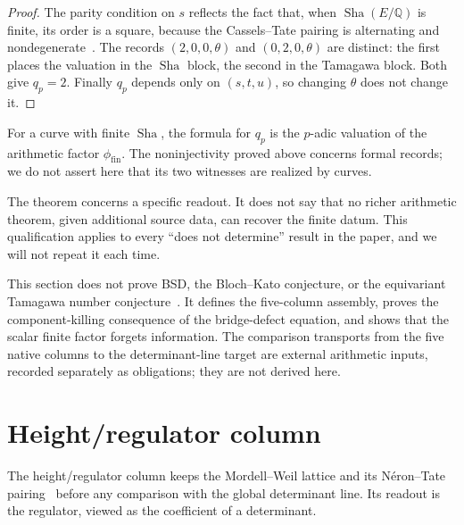 \documentclass[11pt]{article}
\theoremstyle{definition}
\newcommand{\Q}{\mathbb{Q}}
\newcommand{\Sha}{\operatorname{Sha}}
\begin{document}
\begin{proof}
The parity condition on $s$ reflects the fact that, when $\Sha(E/\Q)$ is
finite, its order is a square, because the Cassels--Tate pairing is
alternating and nondegenerate~\citep{Cassels1962,PoonenStoll1999}.  The
records $(2,0,0,\theta)$ and $(0,2,0,\theta)$ are distinct: the first
places the valuation in the $\Sha$ block, the second in the Tamagawa
block.  Both give $q_p=2$.  Finally $q_p$ depends only on $(s,t,u)$, so
changing $\theta$ does not change it.
\end{proof}

For a curve with finite $\Sha$, the formula for $q_p$ is the $p$-adic
valuation of the arithmetic factor $\phi_{\mathrm{fin}}$.  The
noninjectivity proved above concerns formal records; we do not assert here
that its two witnesses are realized by curves.

The theorem concerns a specific readout.  It does not say that no richer
arithmetic theorem, given additional source data, can recover the finite
datum.  This qualification applies to every ``does not determine'' result
in the paper, and we will not repeat it each time.

\begin{nonclaim}
\label{nonclaim:apparatus:decomposition-scope}
This section does not prove BSD, the Bloch--Kato conjecture, or the
equivariant Tamagawa number conjecture~\citep{BurnsFlach2001}.  It defines
the five-column assembly, proves the component-killing consequence of the
bridge-defect equation, and shows that the scalar finite factor forgets
information.  The comparison transports from the five native columns to
the determinant-line target are external arithmetic inputs, recorded
separately as obligations; they are not derived here.
\end{nonclaim}
 \section{Height/regulator column}
\label{sec:height-regulator}

The height/regulator column keeps the Mordell--Weil lattice and its
N\'eron--Tate pairing~\citep{Neron1965,Silverman2009} before any comparison
with the global determinant line.  Its readout is the regulator, viewed as
the coefficient of a determinant.
\end{document}
